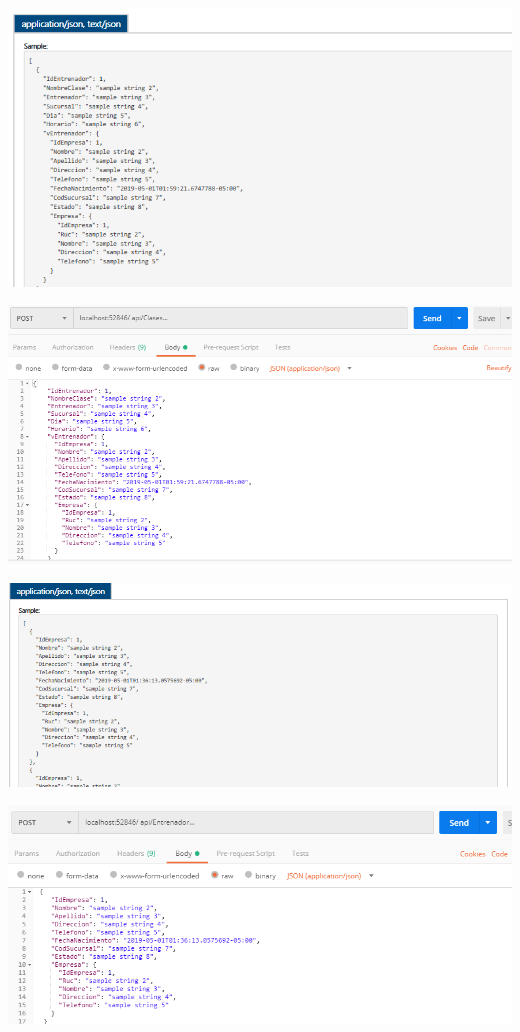 \begin{center}
			\includegraphics[width=15cm]{./Imagenes/14}
             \end{center}
\begin{center}
			\includegraphics[width=15cm]{./Imagenes/15}
             \end{center}
\begin{center}
			\includegraphics[width=15cm]{./Imagenes/16}
             \end{center}
\begin{center}
			\includegraphics[width=15cm]{./Imagenes/17}
             \end{center}




        
        
        

